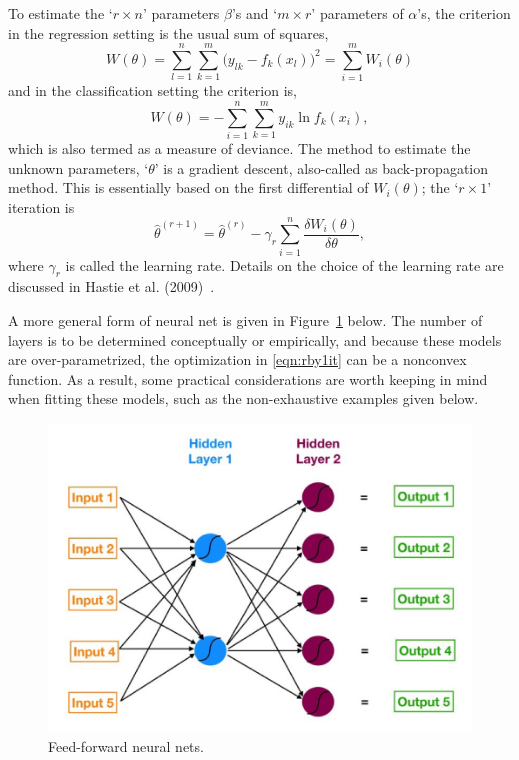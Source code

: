 To estimate the `$r \times n$' parameters $\beta$'s and `$m \times r$' parameters of $\alpha$'s, the criterion in the regression setting is the usual sum of squares,
	\begin{equation} \label{eqn:bigwtheta}
	W(\theta)= \sum_{l=1}^n \sum_{k=1}^m \big(y_{lk} - f_k(x_l)\big)^2 = \sum_{i=1}^m W_i(\theta)
	\end{equation}
and in the classification setting the criterion is, 
	\begin{equation} \label{eqn:bigwtheta2}
	W(\theta)= - \sum_{i=1}^n \sum_{k=1}^m y_{ik} \ln f_k(x_i),
	\end{equation}
which is also termed as a measure of deviance. The method to estimate the unknown parameters, `$\theta$' is a gradient descent, also-called as back-propagation method. This is essentially based on the first differential of $W_i(\theta)$; the `$r \times 1$' iteration is
	\begin{equation} \label{eqn:rby1it}
	\hat{\theta}^{(r+1)}= \hat{\theta}^{(r)} - \gamma_r \sum_{i=1}^n \dfrac{\delta W_i(\theta)}{\delta \theta},
	\end{equation}
where $\gamma_r$ is called the learning rate. Details on the choice of the learning rate are discussed in Hastie et al. (2009)~\cite{hastibf}. 


A more general form of neural net is given in Figure~\ref{fig:neural_net} below. The number of layers is to be determined conceptually or empirically, and because these models are over-parametrized, the optimization in \eqref{eqn:rby1it} can be a nonconvex function. As a result, some practical considerations are worth keeping in mind when fitting these models, such as the non-exhaustive examples given below. 


	\begin{figure}[!ht]
	\centering
	\includegraphics[width=\textwidth]{chapters/chapter_advanced/figures/input_output.png}	
	\caption{Feed-forward neural nets. \label{fig:neural_net}}
	\end{figure}



